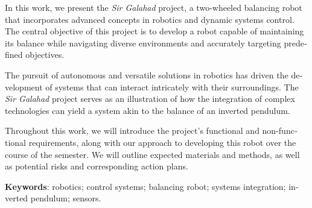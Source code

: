 
\begin{resumo}[Abstract]%

    \begin{otherlanguage}{english}
        
        In this work, we present the \textit{Sir Galahad} project, a two-wheeled balancing robot that incorporates advanced concepts in robotics and dynamic systems control. The central objective of this project is to develop a robot capable of maintaining its balance while navigating diverse environments and accurately targeting predefined objectives.

        The pursuit of autonomous and versatile solutions in robotics has driven the development of systems that can interact intricately with their surroundings. The \textit{Sir Galahad} project serves as an illustration of how the integration of complex technologies can yield a system akin to the balance of an inverted pendulum.
        
        Throughout this work, we will introduce the project's functional and non-functional requirements, along with our approach to developing this robot over the course of the semester. We will outline expected materials and methods, as well as potential risks and corresponding action plans.
    
        \noindent
        \textbf{Keywords}: robotics; control systems; balancing robot; systems integration; inverted pendulum; sensors.

    
    \end{otherlanguage}

\end{resumo}
    
